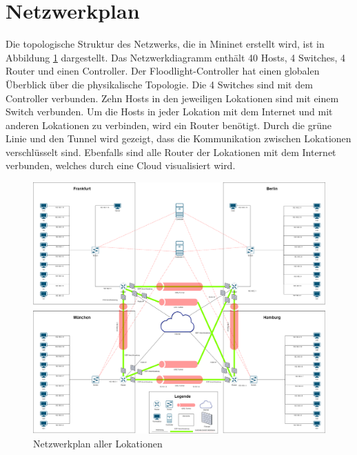\documentclass[fontsize=12pt,paper=a4,open=any,parskip=half,
  twoside=false,toc=listof,toc=bibliography,fleqn,leqno,
  captions=nooneline,captions=tableabove,british]{scrbook}
\begin{document}
\section{Netzwerkplan}
Die topologische Struktur des Netzwerks, die in Mininet erstellt wird, ist in Abbildung \ref{netzwerkplan} dargestellt. Das Netzwerkdiagramm enthält 40 Hosts, 4 Switches, 4 Router und einen Controller. Der Floodlight-Controller hat einen globalen Überblick über die physikalische Topologie. Die 4 Switches sind mit dem Controller verbunden. Zehn Hosts in den jeweiligen Lokationen sind mit einem Switch verbunden. Um die Hosts in jeder Lokation mit dem Internet und mit anderen Lokationen zu verbinden, wird ein Router benötigt. Durch die grüne Linie und den Tunnel wird gezeigt, dass die Kommunikation zwischen Lokationen verschlüsselt sind. Ebenfalls sind alle Router der Lokationen mit dem Internet verbunden, welches durch eine Cloud visualisiert wird.

\begin{figure}[H]
 \centering
 \includegraphics[width=1.0\textwidth]{Bilder/netzwerkplan}
 \captionsetup{justification=centering,margin=1cm}
 \caption{Netzwerkplan aller Lokationen}
 \label{netzwerkplan}
\end{figure}
\end{document}
